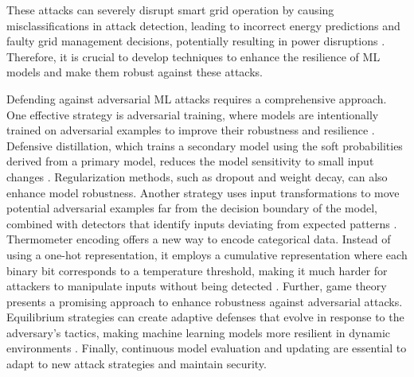 \documentclass[10pt, journal]{IEEEtran}
\begin{document}

These attacks can severely disrupt smart grid operation by causing misclassifications in attack detection, leading to incorrect energy predictions and faulty grid management decisions, potentially resulting in power disruptions \cite{goodfellow2014explaining, he2017adversarial, hitaj2017deep, papernot2016limitations, carlini2017towards}. Therefore, it is crucial to develop techniques to enhance the resilience of ML models and make them robust against these attacks.


Defending against adversarial ML attacks requires a comprehensive approach. One effective strategy is adversarial training, where models are intentionally trained on adversarial examples to improve their robustness and resilience \cite{madry2017towards}. Defensive distillation, which trains a secondary model using the soft probabilities derived from a primary model, reduces the model sensitivity to small input changes \cite{papernot2016distillation}. Regularization methods, such as dropout and weight decay, can also enhance model robustness. Another strategy uses input transformations to move potential adversarial examples far from the decision boundary of the model, combined with detectors that identify inputs deviating from expected patterns \cite{carlini2017magnet}. Thermometer encoding offers a new way to encode categorical data. Instead of using a one-hot representation, it employs a cumulative representation where each binary bit corresponds to a temperature threshold, making it much harder for attackers to manipulate inputs without being detected \cite{buckman2018thermometer}. Further, game theory presents a promising approach to enhance robustness against adversarial attacks. Equilibrium strategies can create adaptive defenses that evolve in response to the adversary's tactics, making machine learning models more resilient in dynamic environments \cite{zhou2019survey, dasgupta2019survey}. Finally, continuous model evaluation and updating are essential to adapt to new attack strategies and maintain security.

\end{document}
